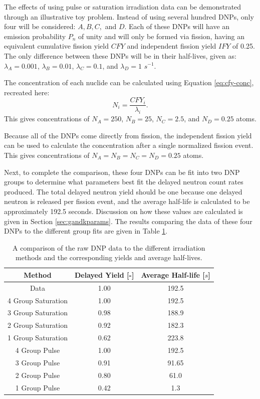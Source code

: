 \renewcommand{\theequation}{D\thechapter.\arabic{equation}}
\label{sec:appendixD}

The effects of using pulse or saturation irradiation data can be demonstrated through an illustrative toy problem.
Instead of using several hundred \glspl{DNP}, only four will be considered: $A, B, C,$ and $D$.
Each of these \glspl{DNP} will have an emission probability $P_n$ of unity and will only be formed via fission, having an equivalent cumulative fission yield $CFY$ and independent fission yield $IFY$ of 0.25.
The only difference between these \glspl{DNP} will be in their half-lives, given as: $\lambda_A=0.001$, $\lambda_B=0.01$, $\lambda_C=0.1$, and $\lambda_D=1$ $s^{-1}$.

The concentration of each nuclide can be calculated using Equation \eqref{eq:cfy-conc}, recreated here:
\begin{equation}
    N_i = \frac{CFY_i}{\lambda_i}.
    \nonumber
\end{equation}
This gives concentrations of $N_A = 250$, $N_B = 25$, $N_C = 2.5$, and $N_D = 0.25$ atoms.

Because all of the \glspl{DNP} come directly from fission, the independent fission yield can be used to calculate the concentration after a single normalized fission event.
This gives concentrations of $N_A = N_B =N_C =N_D=0.25$ atoms.

Next, to complete the comparison, these four \glspl{DNP} can be fit into two \gls{DNP} groups to determine what parameters best fit the delayed neutron count rates produced.
The total delayed neutron yield should be one because one delayed neutron is released per fission event, and the average half-life is calculated to be approximately 192.5 seconds.
Discussion on how these values are calculated is given in Section \ref{sec:gandkparams}.
The results comparing the data of these four \glspl{DNP} to the different group fits are given in Table \ref{tab:pulse-sat-compare}.

\begin{table}[!ht]
    \centering
    \caption{A comparison of the raw \gls{DNP} data to the different irradiation methods and the corresponding yields and average half-lives.}
    \begin{tabular}{ccc}
    \hline
       Method  & Delayed Yield [-] & Average Half-life [$s$] \\
       \hline
        Data & 1.00 & 192.5 \\
        4 Group Saturation & 1.00 & 192.5 \\
        3 Group Saturation & 0.98 & 188.9 \\
        2 Group Saturation & 0.92 & 182.3 \\
        1 Group Saturation & 0.62 & 223.8 \\
        4 Group Pulse & 1.00 & 192.5 \\
        3 Group Pulse & 0.91 & 91.65 \\
        2 Group Pulse & 0.80 & 61.0 \\
        1 Group Pulse & 0.42 & 1.3 \\
        \hline
    \end{tabular}
    \label{tab:pulse-sat-compare}
\end{table}

